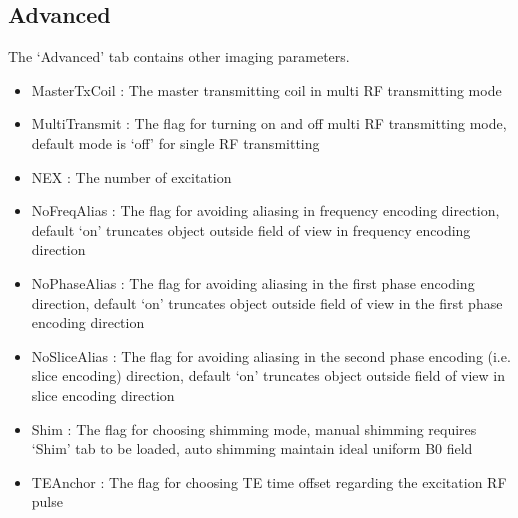 \documentclass{book}%
\begin{document}
\subsection{Advanced}
The `Advanced' tab contains other imaging parameters.
	\begin{itemize}
		\item MasterTxCoil : The master transmitting coil in multi RF transmitting mode
		\item MultiTransmit : The flag for turning on and off multi RF transmitting mode, default mode is `off' for single RF transmitting
		\item NEX : The number of excitation
	  \item NoFreqAlias : The flag for avoiding aliasing in frequency encoding direction, default `on' truncates object outside field of view in frequency encoding direction
		\item NoPhaseAlias : The flag for avoiding aliasing in the first phase encoding direction, default `on' truncates object outside field of view in the first phase encoding direction
		\item NoSliceAlias : The flag for avoiding aliasing in the second phase encoding (i.e. slice encoding) direction, default `on' truncates object outside field of view in slice encoding direction
		\item Shim : The flag for choosing shimming mode, manual shimming requires `Shim' tab to be loaded, auto shimming maintain ideal uniform B0 field
		\item TEAnchor : The flag for choosing TE time offset regarding the excitation RF pulse
	\end{itemize}
\end{document}
